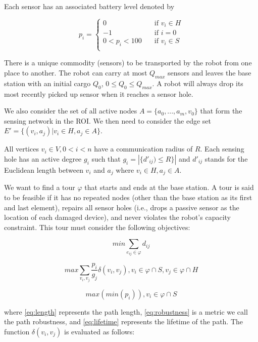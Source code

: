 \documentclass[conference]{IEEEtran}
\begin{document}
Each sensor has an associated battery level denoted by 

\[ p_i = \left\{ \begin{array}{ll}
0 & \quad \text{if $v_i \in H$} \\
{-1} & \quad \text{if $i = 0$} \\
0 < p_i < 100 & \quad \text{if $v_i \in S$} \\
\end{array} \right. \]

There is a unique commodity (sensors) to be transported by the robot from one place to another. The robot can carry at most $Q_{max}$ sensors and leaves the base station with an initial cargo $Q_0$, $0 \leq Q_0 \leq Q_{max}$. A robot will always drop its most recently picked up sensor when it reaches a sensor hole.

We also consider the set of all active nodes $A=\{a_0,...,a_m,v_0\}$ that form the sensing network in the ROI. We then need to consider the edge set $E'=\{(v_i,a_j)|v_i \in  H, a_j \in A\}$.

All vertices $v_i \in V, 0<i<n$ have a communication radius of $R$. Each sensing hole has an active degree $g_i$ such that $g_i = |\{d'_{ij}) \leq R\}|$ and $d'_{ij}$ stands for the Euclidean length  between $v_i$ and $a_j$ where $v_i \in H, a_j \in A$.

We want to find a tour $\varphi$ that starts and ends at the base station. A tour is said to be feasible if it has no repeated nodes (other than the base station as its first and last element), repairs all sensor holes (i.e., drops a passive sensor as the location of each damaged device), and never violates the robot’s capacity constraint. This tour must consider the following objectives:

\begin{equation} \label {eq:length}
min\sum_{e_{ij} \in \varphi} d_{ij}
\end{equation}

\begin{equation} \label {eq:robustness}
max \sum_{v_i,v_j}\frac{p_i}{g_j}\delta(v_i,v_j), v_i \in \varphi \cap S, v_j \in \varphi \cap H
\end{equation}


\begin{equation} \label {eq:lifetime}
max(min (p_i)), v_i \in \varphi \cap S
\end{equation}

where \eqref{eq:length} represents the path length, \eqref{eq:robustness} is a metric we call the path robustness, and \eqref{eq:lifetime} represents the lifetime of the path. The function $\delta(v_i,v_j)$ is evaluated as follows:
\end{document}
